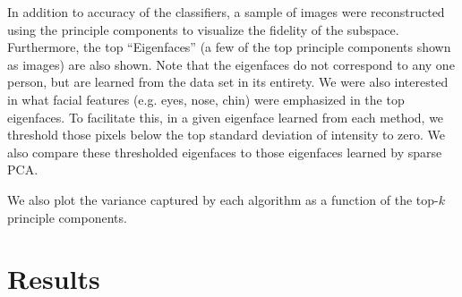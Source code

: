 \documentclass[11pt,letterpaper]{article}
\begin{document}
In addition to accuracy of the classifiers, a sample of images were reconstructed using the principle components to visualize the fidelity of the subspace. Furthermore, the top ``Eigenfaces'' (a few of the top principle components shown as images) are also shown. Note that the eigenfaces do not correspond to any one person, but are learned from the data set in its entirety. We were also interested in what facial features (e.g. eyes, nose, chin) were emphasized in the top eigenfaces. To facilitate this, in a given eigenface learned from each method, we threshold those pixels below the top standard deviation of intensity to zero. We also compare these thresholded eigenfaces to those eigenfaces learned by sparse PCA. 

We also plot the variance captured by each algorithm as a function of the top-$k$ principle components. 


\section{Results}
\end{document}
